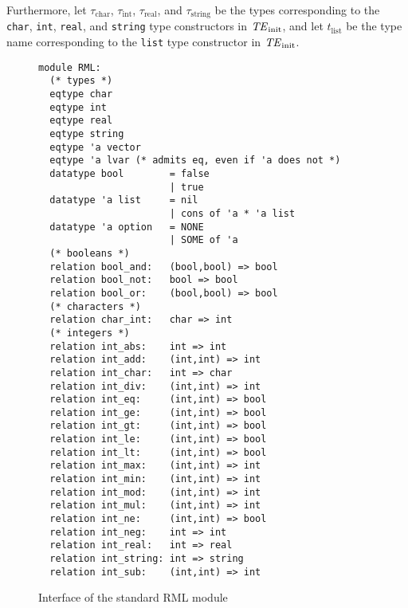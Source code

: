 Furthermore, let $\tau_{\mathrm{char}}$, $\tau_{\mathrm{int}}$,
$\tau_{\mathrm{real}}$, and $\tau_{\mathrm{string}}$ be the types
corresponding to the \texttt{char}, \texttt{int}, \texttt{real}, and
\texttt{string} type constructors in $\mbox{\textit{TE}}_{\mathrm{init}}$, and let
$t_{\mathrm{list}}$ be the type name corresponding to the
\texttt{list} type constructor in $\mbox{\textit{TE}}_{\mathrm{init}}$.
%
\begin{figure}[p]
\begin{verbatim}
module RML:
  (* types *)
  eqtype char
  eqtype int
  eqtype real
  eqtype string
  eqtype 'a vector
  eqtype 'a lvar (* admits eq, even if 'a does not *)
  datatype bool        = false
                       | true
  datatype 'a list     = nil
                       | cons of 'a * 'a list
  datatype 'a option   = NONE
                       | SOME of 'a
  (* booleans *)
  relation bool_and:   (bool,bool) => bool
  relation bool_not:   bool => bool
  relation bool_or:    (bool,bool) => bool
  (* characters *)  
  relation char_int:   char => int
  (* integers *)
  relation int_abs:    int => int
  relation int_add:    (int,int) => int
  relation int_char:   int => char
  relation int_div:    (int,int) => int
  relation int_eq:     (int,int) => bool
  relation int_ge:     (int,int) => bool
  relation int_gt:     (int,int) => bool
  relation int_le:     (int,int) => bool
  relation int_lt:     (int,int) => bool
  relation int_max:    (int,int) => int
  relation int_min:    (int,int) => int
  relation int_mod:    (int,int) => int
  relation int_mul:    (int,int) => int
  relation int_ne:     (int,int) => bool
  relation int_neg:    int => int
  relation int_real:   int => real
  relation int_string: int => string
  relation int_sub:    (int,int) => int
\end{verbatim}
\caption{Interface of the standard RML module}
\end{figure}

